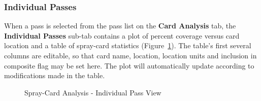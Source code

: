 \documentclass[10pt,letterpaper,titlepage]{article}
\begin{document}
    \subsubsection{Individual Passes}
    When a pass is selected from the pass list on the \textbf{Card Analysis} tab, the \textbf{Individual Passes} sub-tab contains a plot of percent coverage versus card location and a table of spray-card statistics (Figure~\ref{fig:card_individual_pass}). The table's first several columns are editable, so that card name, location, location units and inclusion in composite flag may be set here. The plot will automatically update according to modifications made in the table.
    \begin{figure}[hb]
        \centering
        \caption{Spray-Card Analysis - Individual Pass View}
        \label{fig:card_individual_pass}
    \end{figure}
    \FloatBarrier
    \newpage
\end{document}
